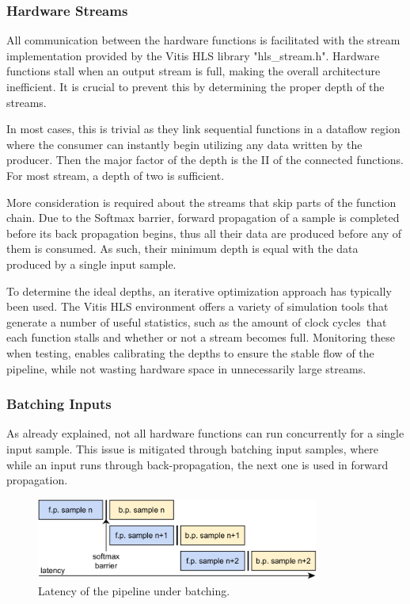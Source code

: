 \subsubsection{Hardware Streams}
All communication between the hardware functions is facilitated with the stream implementation provided by the Vitis HLS library "hls\_stream.h". Hardware functions stall when an output stream is full, making the overall architecture inefficient. It is crucial to prevent this by determining the proper depth of the streams.

In most cases, this is trivial as they link sequential functions in a dataflow region where the consumer can instantly begin utilizing any data written by the producer. Then the major factor of the depth is the II of the connected functions. For most stream, a depth of two is sufficient.

More consideration is required about the streams that skip parts of the function chain. Due to the Softmax barrier, forward propagation of a sample is completed before its back propagation begins, thus all their data are produced before any of them is consumed. As such, their minimum depth is equal with the data produced by a single input sample.

To determine the ideal depths, an iterative optimization approach has typically been used. The Vitis HLS environment offers a variety of simulation tools that generate a number of useful statistics, such as the amount of clock cycles that each function stalls and whether or not a stream becomes full. Monitoring these when testing, enables calibrating the depths to ensure the stable flow of the pipeline, while not wasting hardware space in unnecessarily large streams.

\subsubsection{Batching Inputs}
As already explained, not all hardware functions can run concurrently for a single input sample. This issue is mitigated through batching input samples, where while an input runs through back-propagation, the next one is used in forward propagation. %

\begin{figure}[H]
    \centering
        \includegraphics[width=0.83\textwidth]{Images/diagrams/pipeline_under_batching.png}
        \decoRule
        \caption[Pipeline with batching latency]{ Latency of the pipeline under batching.}
        \label{fig: Batching Pipeline latency}
\end{figure}

